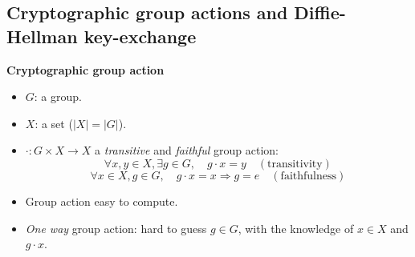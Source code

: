\documentclass[10pt]{beamer}
\theoremstyle{plain}
\theoremstyle{definition}
\renewcommand{\(}{\left(}
\renewcommand{\)}{\right)}
\begin{document}
\subsection{Cryptographic group actions and Diffie-Hellman key-exchange}


\begin{frame}
\textbf{Cryptographic group action}

\vspace{0.5cm}

\begin{itemize}
\item $G$: a group.
\item $X$: a set ($|X|=|G|$).
\pause 
\item $\cdot : G\times X\longrightarrow X$ a \emph{transitive} and \emph{faithful} group action:
\[\forall x,y\in X, \exists g\in G, \quad g\cdot x=y \quad (\mbox{transitivity})\]
\[\forall x\in X,  g\in G, \quad g\cdot x=x \Longrightarrow g=e \quad (\mbox{faithfulness})\]
\pause
\item Group action easy to compute.
\item \emph{One way} group action: hard to guess $g\in G$, with the knowledge of $x\in X$ and $g\cdot x$.
\end{itemize}

\end{frame}
\end{document}
